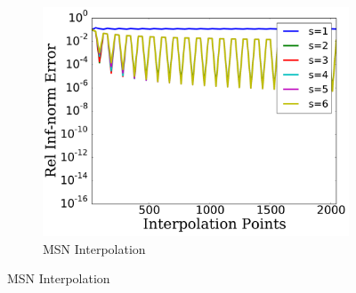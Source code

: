 
\begin{figure}[p]
    \centering
    \begin{subfigure}{0.45\textwidth}
    \includegraphics[width=\textwidth]{plots/msn_birkhoff_rough_sharp_funcs_2.pdf}
    \caption{MSN Interpolation}
    \end{subfigure}


\end{figure}
